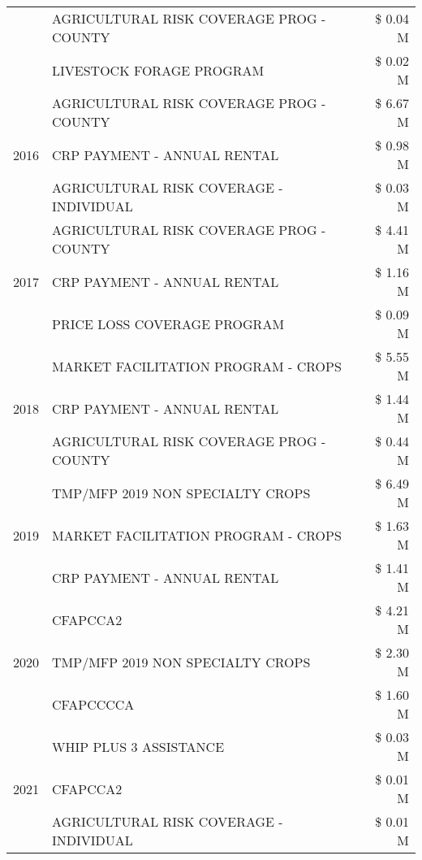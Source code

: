 \begin{tabular}{llr}
 & AGRICULTURAL RISK COVERAGE PROG - COUNTY & \$ 0.04 M \\
 & LIVESTOCK FORAGE PROGRAM & \$ 0.02 M \\
\cline{1-3}
\multirow[t]{3}{*}{2016} & AGRICULTURAL RISK COVERAGE PROG - COUNTY      & \$ 6.67 M \\
 & CRP PAYMENT - ANNUAL RENTAL                   & \$ 0.98 M \\
 & AGRICULTURAL RISK COVERAGE - INDIVIDUAL       & \$ 0.03 M \\
\cline{1-3}
\multirow[t]{3}{*}{2017} & AGRICULTURAL RISK COVERAGE PROG - COUNTY & \$ 4.41 M \\
 & CRP PAYMENT - ANNUAL RENTAL & \$ 1.16 M \\
 & PRICE LOSS COVERAGE PROGRAM & \$ 0.09 M \\
\cline{1-3}
\multirow[t]{3}{*}{2018} & MARKET FACILITATION PROGRAM - CROPS & \$ 5.55 M \\
 & CRP PAYMENT - ANNUAL RENTAL & \$ 1.44 M \\
 & AGRICULTURAL RISK COVERAGE PROG - COUNTY & \$ 0.44 M \\
\cline{1-3}
\multirow[t]{3}{*}{2019} & TMP/MFP 2019 NON SPECIALTY CROPS & \$ 6.49 M \\
 & MARKET FACILITATION PROGRAM - CROPS & \$ 1.63 M \\
 & CRP PAYMENT - ANNUAL RENTAL & \$ 1.41 M \\
\cline{1-3}
\multirow[t]{3}{*}{2020} & CFAPCCA2 & \$ 4.21 M \\
 & TMP/MFP 2019 NON SPECIALTY CROPS & \$ 2.30 M \\
 & CFAPCCCCA & \$ 1.60 M \\
\cline{1-3}
\multirow[t]{3}{*}{2021} & WHIP PLUS 3 ASSISTANCE & \$ 0.03 M \\
 & CFAPCCA2 & \$ 0.01 M \\
 & AGRICULTURAL RISK COVERAGE - INDIVIDUAL & \$ 0.01 M \\
\cline{1-3}
\bottomrule
\end{tabular}
